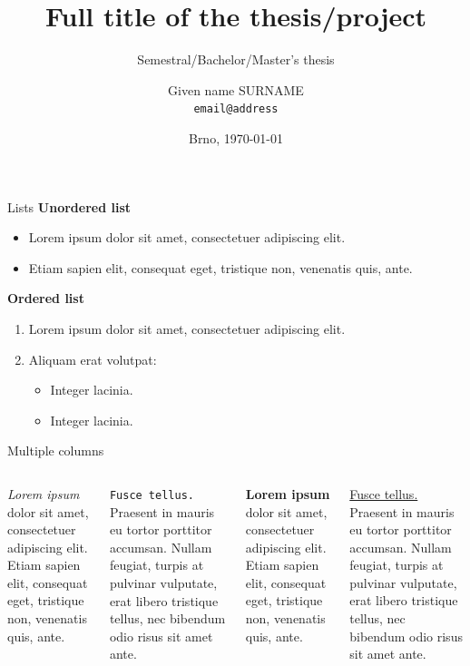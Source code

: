 \documentclass[aspectratio=1610]{beamer}
\title[Short titles]
{Full title of the thesis/project}
\subtitle
{Semestral/Bachelor/Master's thesis}
\author[Given name SURNAME]
{Given name SURNAME\\
\texttt{email@address}}
\institute
{Department of Radio Electronics\\
Brno University of Technology, Czechia}
\date[\today]
{Brno, \today}
\begin{document}

\begin{frame}
    \titlepage
\end{frame}


\begin{frame}{Lists}
    \textbf{Unordered list}
    \begin{itemize}
        \item Lorem ipsum dolor sit amet, consectetuer adipiscing elit.

        \item Etiam sapien elit, consequat eget, tristique non, venenatis quis, ante.
    \end{itemize}
    \bigskip

    \textbf{Ordered list}
    \begin{enumerate}
        \item \alert{Lorem ipsum dolor} sit amet, consectetuer adipiscing elit.

        \item Aliquam erat volutpat:
        \begin{itemize}
            \item Integer lacinia.

            \item Integer lacinia.
        \end{itemize}
    \end{enumerate}
\end{frame}



\begin{frame}{Multiple columns}
    \begin{columns}
        \textit{Lorem ipsum} dolor sit amet, consectetuer adipiscing elit. Etiam sapien elit, consequat eget, tristique non, venenatis quis, ante.
        \bigskip
        
        \texttt{Fusce tellus.} Praesent in mauris eu tortor porttitor accumsan. Nullam feugiat, turpis at pulvinar vulputate, erat libero tristique tellus, nec bibendum odio risus sit amet ante.

        \textbf{Lorem ipsum} dolor sit amet, consectetuer adipiscing elit. Etiam sapien elit, consequat eget, tristique non, venenatis quis, ante.
        \bigskip
        
        \underline{Fusce tellus.} Praesent in mauris eu tortor porttitor accumsan. Nullam feugiat, turpis at pulvinar vulputate, erat libero tristique tellus, nec bibendum odio risus sit amet ante.
    \end{columns}
\end{frame}
\end{document}
